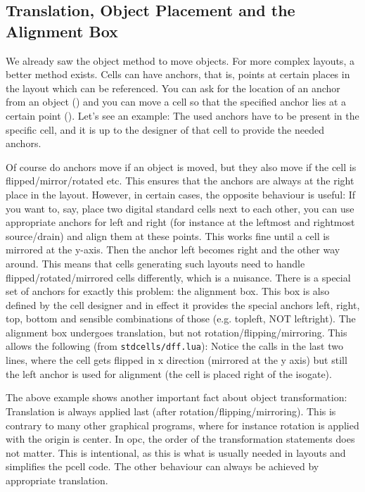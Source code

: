 \subsection{Translation, Object Placement and the Alignment Box}
We already saw the  object method to move objects. For more complex layouts, a better method exists. Cells can have anchors, that is, points
at certain places in the layout which can be referenced. You can ask for the location of an anchor from an object () and you can move a
cell so that the specified anchor lies at a certain point (). Let's see an example:
The used anchors have to be present in the specific cell, and it is up to the designer of that cell to provide the needed anchors.

Of course do anchors move if an object is moved, but they also move if the cell is flipped/mirror/rotated etc. This ensures that the anchors are always at the
right place in the layout. However, in certain cases, the opposite behaviour is useful: If you want to, say, place two digital standard cells next to each other,
you can use appropriate anchors for left and right (for instance at the leftmost and rightmost source/drain) and align them at these points. This works fine
until a cell is mirrored at the y-axis. Then the anchor left becomes right and the other way around. This means that cells generating such layouts need to handle
flipped/rotated/mirrored cells differently, which is a nuisance. There is a special set of anchors for exactly this problem: the alignment box. This box is also
defined by the cell designer and in effect it provides the special anchors left, right, top, bottom and sensible combinations of those (e.g. topleft, NOT
leftright). The alignment box undergoes translation, but not rotation/flipping/mirroring. This allows the following (from \texttt{stdcells/dff.lua}):
Notice the calls in the last two lines, where the cell gets flipped in x direction (mirrored at the y axis) but still the left anchor is used for alignment (the
cell is placed right of the isogate).

The above example shows another important fact about object transformation: Translation is always applied last (after rotation/flipping/mirroring). This is
contrary to many other graphical programs, where for instance rotation is applied with the origin is center. In opc, the order of the transformation statements
does not matter. This is intentional, as this is what is usually needed in layouts and simplifies the pcell code. The other behaviour can always be achieved by
appropriate translation.


